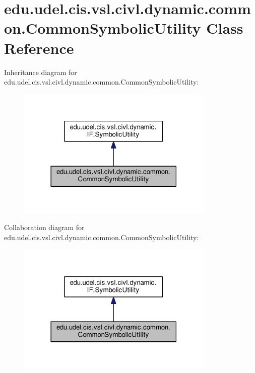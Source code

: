 \hypertarget{classedu_1_1udel_1_1cis_1_1vsl_1_1civl_1_1dynamic_1_1common_1_1CommonSymbolicUtility}{}\section{edu.\+udel.\+cis.\+vsl.\+civl.\+dynamic.\+common.\+Common\+Symbolic\+Utility Class Reference}
\label{classedu_1_1udel_1_1cis_1_1vsl_1_1civl_1_1dynamic_1_1common_1_1CommonSymbolicUtility}


Inheritance diagram for edu.\+udel.\+cis.\+vsl.\+civl.\+dynamic.\+common.\+Common\+Symbolic\+Utility\+:
\nopagebreak
\begin{figure}[H]
\begin{center}
\leavevmode
\includegraphics[width=266pt]{classedu_1_1udel_1_1cis_1_1vsl_1_1civl_1_1dynamic_1_1common_1_1CommonSymbolicUtility__inherit__graph}
\end{center}
\end{figure}


Collaboration diagram for edu.\+udel.\+cis.\+vsl.\+civl.\+dynamic.\+common.\+Common\+Symbolic\+Utility\+:
\nopagebreak
\begin{figure}[H]
\begin{center}
\leavevmode
\includegraphics[width=266pt]{classedu_1_1udel_1_1cis_1_1vsl_1_1civl_1_1dynamic_1_1common_1_1CommonSymbolicUtility__coll__graph}
\end{center}
\end{figure}
